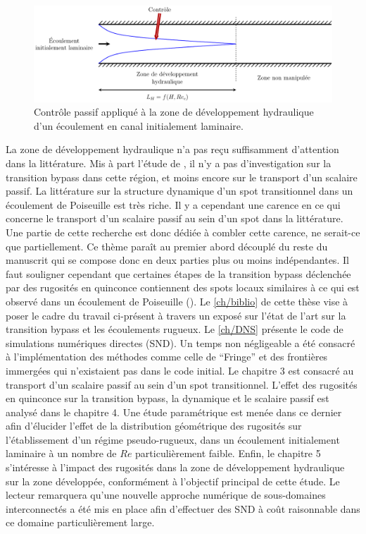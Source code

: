 \vspace{3cm}
\begin{figure}[!hbtp]
    \centering
    \includegraphics[width=\linewidth]{Intro/Pictures/Figure_intro.pdf}
    \caption{Contrôle passif appliqué à la zone de développement hydraulique d'un écoulement en canal initialement laminaire.}
    \label{fig/fig_intro}
\end{figure}

\clearpage
La zone de développement hydraulique n’a pas reçu suffisamment d’attention dans la littérature. Mis à part l'étude de \cite{Buffat2014}, il n'y a pas d'investigation sur la transition bypass dans cette région, et moins encore sur le transport d'un scalaire passif. La littérature sur la structure dynamique d'un spot transitionnel dans un écoulement de Poiseuille est très riche. Il y a cependant une carence en ce qui concerne le transport d'un scalaire passif au sein d'un spot dans la littérature. Une partie de cette recherche est donc dédiée à combler cette carence, ne serait-ce que partiellement. Ce thème paraît au premier abord découplé du reste du manuscrit qui se compose donc en deux parties plus ou moins indépendantes. Il faut souligner cependant que certaines étapes de la transition bypass déclenchée par des rugosités en quinconce contiennent des spots locaux similaires à ce qui est observé dans un écoulement de Poiseuille (\cite{Anika2020}). Le \cref{ch/biblio} de cette thèse vise à poser le cadre du travail ci-présent à travers un exposé sur l'état de l'art sur la transition bypass et les écoulements rugueux. Le \cref{ch/DNS} présente le code de simulations numériques directes (SND). Un temps non négligeable a été consacré à l'implémentation des méthodes comme celle de \foreignquote{french}{Fringe} et des frontières immergées qui n'existaient pas dans le code initial. Le chapitre 3 est consacré au transport d'un scalaire passif au sein d'un spot transitionnel. L'effet des rugosités en quinconce sur la transition bypass, la dynamique et le scalaire passif est analysé dans le chapitre 4. Une étude paramétrique est menée dans ce dernier afin d'élucider l'effet de la distribution géométrique des rugosités sur l'établissement d'un régime pseudo-rugueux, dans un écoulement initialement laminaire à un nombre de $Re$ particulièrement faible. Enfin, le chapitre 5 s'intéresse à l'impact des rugosités dans la zone de développement hydraulique sur la zone développée, conformément à l'objectif principal de cette étude. Le lecteur remarquera qu'une nouvelle approche numérique de sous-domaines interconnectés a été mis en place afin d'effectuer des SND à coût raisonnable dans ce domaine particulièrement large.
